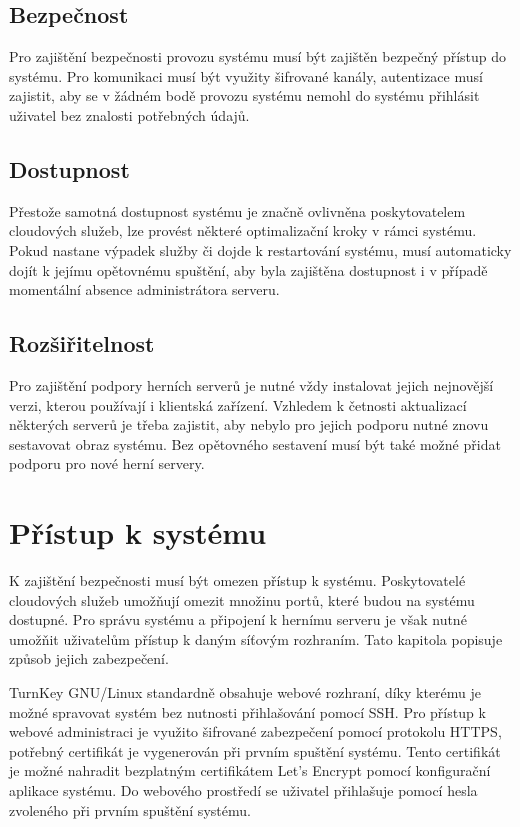 \subsection{Bezpečnost}

Pro zajištění bezpečnosti provozu systému musí být zajištěn bezpečný přístup do systému. Pro komunikaci musí být využity šifrované kanály, autentizace
musí zajistit, aby se v žádném bodě provozu systému nemohl do systému přihlásit uživatel bez znalosti potřebných údajů.

\subsection{Dostupnost}

Přestože samotná dostupnost systému je značně ovlivněna poskytovatelem cloudových služeb, lze provést některé optimalizační kroky v rámci systému.
Pokud nastane výpadek služby či dojde k restartování systému, musí automaticky dojít k jejímu opětovnému spuštění, aby byla zajištěna dostupnost i v případě
momentální absence administrátora serveru.

\subsection{Rozšiřitelnost}

Pro zajištění podpory herních serverů je nutné vždy instalovat jejich nejnovější verzi, kterou používají i klientská zařízení.
Vzhledem k četnosti aktualizací některých serverů je třeba zajistit, aby nebylo pro jejich podporu nutné znovu sestavovat obraz systému.
Bez opětovného sestavení musí být také možné přidat podporu pro nové herní servery. 

\section{Přístup k systému}

K zajištění bezpečnosti musí být omezen přístup k systému. Poskytovatelé cloudových služeb
umožňují omezit množinu portů, které budou na systému dostupné. Pro správu systému a připojení k hernímu
serveru je však nutné umožňit uživatelům přístup k daným síťovým rozhraním. Tato kapitola popisuje způsob jejich zabezpečení.

TurnKey GNU/Linux standardně obsahuje webové rozhraní,
díky kterému je možné spravovat systém bez nutnosti přihlašování pomocí SSH. Pro přístup k webové administraci
je využito šifrované zabezpečení pomocí protokolu HTTPS, potřebný certifikát je vygenerován při prvním spuštění systému.
Tento certifikát je možné nahradit bezplatným certifikátem Let's Encrypt \cite{lets_encrypt} pomocí konfigurační aplikace systému.
Do webového prostředí se uživatel přihlašuje pomocí hesla zvoleného při prvním spuštění systému. 

